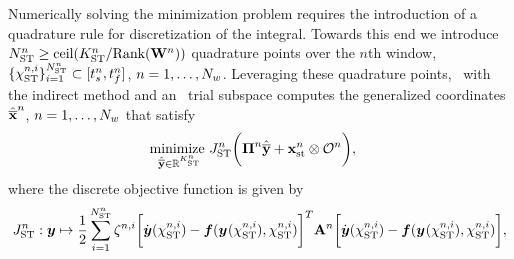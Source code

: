 Numerically solving the minimization problem requires the introduction of a quadrature rule for 
discretization of the integral. Towards this end we introduce $N_{\text{ST}}^{n} \ge \text{ceil}(K_{\text{ST}}^{n}/ \text{Rank}(\mathbf{W}^{n}))$ quadrature points over the $n$th window, $ \{ \chi_{\text{ST}}^{n,i} \}_{i=1}^{N_{\text{ST}}^{n}} \subset [t_s^{n},t_f^{n}]$, $n=1,\ldots,N_w$. 
Leveraging these quadrature points, \methodAcronym\ with the indirect method and an \spaceTimeAcronym\ trial subspace computes the generalized coordinates 
$\hat{\mathbf{\overline{x}}}^{n}$, $n=1,\ldots,N_w$ that satisfy
\begin{equation}\label{eq:obj_gen_slab2} 
\begin{split}
&\underset{\stgenstatey \in \RR{\stdimArg{n}}}{\text{minimize }} \objectiveDiscreteSTArg{n} \bigg( \stbasisArgnt{n} \stgenstatey + \stateInterceptSTArg{n} \otimes \onesFunctionArg{n}  \bigg) , %
\end{split} 
\end{equation}
where the discrete objective function is given by
$$J_{\text{ST}}^{n}: \boldsymbol y \mapsto \frac{1}{2}\sum_{i=1}^{N_{\text{ST}}^{n}} \zeta^{n,i} 
\bigg[ \dot{\boldsymbol y}(\chi_{\text{ST}}^{n,i})  - \boldsymbol f (\boldsymbol y^{}(\chi_{\text{ST}}^{n,i}),\chi_{\text{ST}}^{n,i} ) \bigg]^T 
\mathbf{A}^{n} 
\bigg[ \dot{\boldsymbol y}(\chi_{\text{ST}}^{n,i})  - \boldsymbol f (\boldsymbol y^{}(\chi_{\text{ST}}^{n,i}),\chi_{\text{ST}}^{n,i} ) \bigg],
$$
